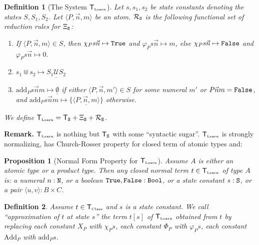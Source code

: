 \documentclass[copyright,creativecommons]{eptcs}
\newcommand{\Nat}                      { {\tt N} }
\newcommand{\Bool}                     { {\tt Bool} }
\newcommand{\State}                    { {\tt S} }
\newcommand{\SystemT}                  {\mathsf{T}}
\newcommand{\True}                     { {\tt{True}} }
\newcommand{\False}                    { {\tt{False}} }
\newcommand{\Class}                    {\mbox{\tiny Class}}
\newcommand{\Learn}                    {\mbox{\tiny Learn}}
\newcommand{\SystemTState}             {\SystemT_\State}
\newcommand{\SystemTClass}             {{\SystemT_{\Class}}}
\newcommand{\SystemTLearn}             {{\SystemT_{\Learn}}}
\newcommand{\CupSem}                   { {\mathcal U} }
\newcommand{\Add}                      { {\mbox{Add}} }
\newcommand{\add}                      { {\mbox{add}} }
\newcommand{\makestate}      [1]       { {\underline{#1}} }
\newtheorem{proposition}{Proposition}
\newtheorem{definition}{Definition}
\begin{document}
\begin{definition}[The System $\SystemTLearn$] \label{definition-EquationalTheoryL1}
Let  $s, s_1, s_2$ be state constants denoting the states $S, S_1, S_2$. Let $\langle P, \vec{n},m \rangle$ be an atom. $\mathcal{R}_\State$ is the following functional set of reduction rules for $\Xi_\State$:
\begin{enumerate}
\item
If $\langle P,\vec{n},{m}\rangle \in S$, then
$\chi_P{s}\vec{n} \mapsto {\True}$ and $\varphi_P{s}\vec{n} \mapsto {m}$, else
$\chi_P{s}\vec{n} \mapsto {\False}$ and $\varphi_P{s}\vec{n} \mapsto {0}$.

\item
${s_1}\Cup{s_2} \mapsto \makestate{S_1 \CupSem S_2}$
\item
$\add_P{s}\vec{n}{m} \mapsto \makestate{\emptyset}$ if either $\langle P,\vec{n},{m'} \rangle \in S$ for some numeral $m'$ or $P\vec{n}{m} = {\False}$, and $\add_P{s}\vec{n}{m} \mapsto \makestate{\{\langle P,\vec{n},{m} \rangle\}}$ otherwise.

\end{enumerate}

We define $\SystemTLearn = \SystemT_\State + \Xi_\State + \mathcal{R}_\State$.
\end{definition}
\textbf{Remark.} $\SystemTLearn$ is nothing but $\SystemTState$ with some ``syntactic sugar''.  $\SystemTLearn$ is strongly normalizing, has Church-Rosser property for closed term of atomic types and:


\begin{proposition}[Normal Form Property for $\SystemTLearn$]\label{proposition-normalform} Assume $A$ is either an atomic type or a product type. Then any closed normal term $t \in \SystemTLearn$ of type $A$ is: a numeral ${n}:\Nat$, or a boolean $\True,\False:\Bool$, or a state constant $s:\State$, or a pair $\langle u,v \rangle: B \times C$.
\end{proposition}



\begin{definition} Assume $t \in \SystemTClass$ and  $s$ is a state constant. We call ``approximation of $t$ at state $s$'' the term $t[{s}]$ of $\SystemTLearn$ obtained from $t$ by replacing each constant $X_P$ with $\chi_P{s}$, each constant $\Phi_P$ with $\varphi_P{s}$, each constant $\Add_P$ with $\add_P{s}$.
\end{definition}
\end{document}
